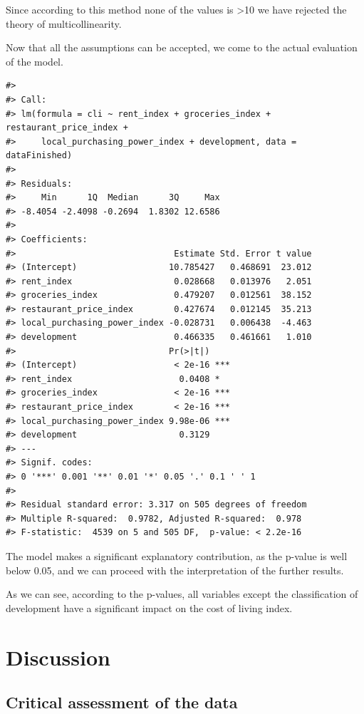 \documentclass[
  11pt,
  a4paper,
  twoside]{scrbook}
\begin{document}
Since according to this method none of the values is \textgreater10 we have rejected the theory of multicollinearity.

Now that all the assumptions can be accepted, we come to the actual evaluation of the model.

\begin{verbatim}
#> 
#> Call:
#> lm(formula = cli ~ rent_index + groceries_index + restaurant_price_index + 
#>     local_purchasing_power_index + development, data = dataFinished)
#> 
#> Residuals:
#>     Min      1Q  Median      3Q     Max 
#> -8.4054 -2.4098 -0.2694  1.8302 12.6586 
#> 
#> Coefficients:
#>                               Estimate Std. Error t value
#> (Intercept)                  10.785427   0.468691  23.012
#> rent_index                    0.028668   0.013976   2.051
#> groceries_index               0.479207   0.012561  38.152
#> restaurant_price_index        0.427674   0.012145  35.213
#> local_purchasing_power_index -0.028731   0.006438  -4.463
#> development                   0.466335   0.461661   1.010
#>                              Pr(>|t|)    
#> (Intercept)                   < 2e-16 ***
#> rent_index                     0.0408 *  
#> groceries_index               < 2e-16 ***
#> restaurant_price_index        < 2e-16 ***
#> local_purchasing_power_index 9.98e-06 ***
#> development                    0.3129    
#> ---
#> Signif. codes:  
#> 0 '***' 0.001 '**' 0.01 '*' 0.05 '.' 0.1 ' ' 1
#> 
#> Residual standard error: 3.317 on 505 degrees of freedom
#> Multiple R-squared:  0.9782, Adjusted R-squared:  0.978 
#> F-statistic:  4539 on 5 and 505 DF,  p-value: < 2.2e-16
\end{verbatim}

The model makes a significant explanatory contribution, as the p-value is well below 0.05, and we can proceed with the interpretation of the further results.

As we can see, according to the p-values, all variables except the classification of development have a significant impact on the cost of living index.

\hypertarget{discussion}{%
\chapter{Discussion}\label{discussion}}

\hypertarget{critical-assessment}{%
\section{Critical assessment of the data}\label{critical-assessment}}
\end{document}
